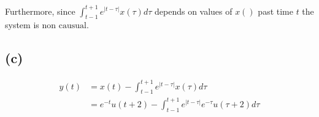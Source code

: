 \documentclass[12pt]{article}
\begin{document}
Furthermore, since $\int_{t-1}^{t+1}e^{|t-\tau|}x(\tau)d\tau$ depends on values of $x()$ past time $t$ the system is $\boxed{\text{non causual}}$.
\subsection*{(c)}
\begin{align*}
y(t)&=x(t)-\int_{t-1}^{t+1}e^{|t-\tau|}x(\tau)d\tau\\
&=\boxed{e^{-t}u(t+2)-\int_{t-1}^{t+1}e^{|t-\tau|}e^{-\tau}u(\tau+2)d\tau}
\end{align*}
\end{document}
